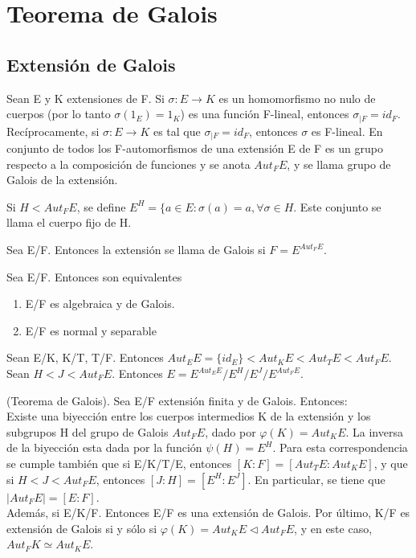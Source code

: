 \section{Teorema de Galois}
\subsection{Extensión de Galois}
\begin{defi}
Sean E y K extensiones de F. Si $\sigma : E\rightarrow K$ es un homomorfismo no nulo de cuerpos (por lo tanto $\sigma(1_{E})=1_{K}$) es una función F-lineal, entonces $\sigma_{|F}=id_{F}$. Recíprocamente, si $\sigma : E\rightarrow K$ es tal que $\sigma_{|F}=id_{F}$, entonces $\sigma$ es F-lineal. En conjunto de todos los F-automorfismos de una extensión E de F es un grupo respecto a la composición de funciones y se anota $Aut_{F}E$, y se llama grupo de Galois de la extensión.
\end{defi}
\begin{defi}
Si $H < Aut_{F}E$, se define $E^{H}=\lbrace a\in E: \sigma(a)=a, \forall \sigma \in H$. Este conjunto se llama el cuerpo fijo de H.
\end{defi}
\begin{defi}
Sea E/F. Entonces la extensión se llama de Galois si $F=E^{Aut_{F}E}$.
\end{defi}
\begin{prop}
Sea E/F. Entonces son equivalentes
\begin{enumerate}
    \item E/F es algebraica y de Galois.
    \item E/F es normal y separable
\end{enumerate}
\end{prop}
\begin{lema}
Sean E/K, K/T, T/F. Entonces $Aut_{E}E=\lbrace id_{E} \rbrace < Aut_{K}E < Aut_{T}E < Aut_{F}E$.\\
Sean $H < J < Aut_{F}E$. Entonces $E=E^{Aut_{E}E}/E^{H}/E^{J}/E^{Aut_{F}E}$.
\end{lema}
\begin{teo}
(Teorema de Galois). Sea E/F extensión finita y de Galois. Entonces:\\
Existe una biyección entre los cuerpos intermedios K de la extensión y los subgrupos H del grupo de Galois $Aut_{F}E$, dado por $\varphi(K)=Aut_{K}E$. La inversa de la biyección esta dada por la función $\psi(H)=E^{H}$. Para esta correspondencia se cumple también que si E/K/T/E, entonces $[K:F]=[Aut_{T}E:Aut_{K}E]$, y que si $H < J < Aut_{F}E$, entonces $[J:H]=[E^{H}:E^{J}]$. En particular, se tiene que $|Aut_{F}E|=[E:F]$.\\
Además, si E/K/F. Entonces E/F es una extensión de Galois. Por último, K/F es extensión de Galois si y sólo si $\varphi(K)=Aut_{K}E \triangleleft Aut_{F}E$, y en este caso, $Aut_{F}K \simeq Aut_{K}E$.
\end{teo}

